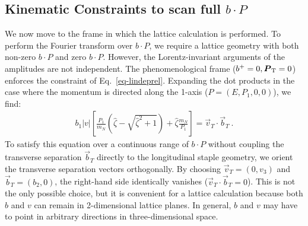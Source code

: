 \subsection{Kinematic Constraints to scan full \texorpdfstring{$b\cdot P$}{b.P}}
\label{sec:kinematic_constraints}
We now move to the frame in which the lattice calculation is performed. To perform the Fourier transform over $b \cdot P$, we require a lattice geometry with both non-zero $b \cdot P$ and zero $b \cdot P$. However, the Lorentz-invariant arguments of the amplitudes are not independent. The phenomenological frame ($b^+=0, \boldsymbol{P}_{\mathrm T}=0$) enforces the constraint of Eq.~\eqref{eq-lindeprel}. Expanding the dot products in the case where the momentum is directed along the 1-axis ($P = (E, P_1, 0, 0)$), we find:
\begin{align}
    b_{1}|v|\left[\frac{P_{1}}{m_{N}}\left(\hat{\zeta}-\sqrt{\hat{\zeta}^2+1}\right)+\hat{\zeta}\frac{m_{N}}{P_{1}}\right]=\vec{v}_{T}\cdot\vec{b}_{T} \ .\label{constraints}
\end{align}
To satisfy this equation over a continuous range of $b \cdot P$ without coupling the transverse separation $\vec{b}_T$ directly to the longitudinal staple geometry, we orient the transverse separation vectors orthogonally. By choosing $\vec{v}_{T}=(0,v_{3})$ and $\vec{b}_{T}=(b_{2},0)$, the right-hand side identically vanishes ($\vec{v}_{T}\cdot\vec{b}_{T} = 0$). This is not the only possible choice, but it is convenient for a lattice calculation because both $b$ and $v$ can remain in 2-dimensional lattice planes. In general, $b$ and $v$ may have to point in arbitrary directions in three-dimensional space.

